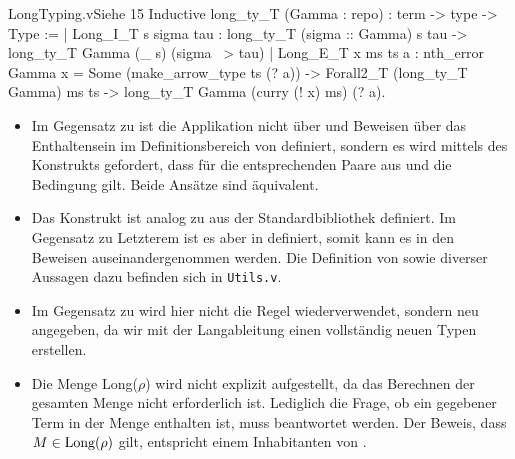 \begin{code}[long_ty_T]{LongTyping.v}{Siehe }{15}
Inductive long_ty_T (Gamma : repo) : term -> type -> Type :=
  | Long_I_T s sigma tau : long_ty_T (sigma :: Gamma) s tau ->
      long_ty_T Gamma (\_ s) (sigma ~> tau)
  | Long_E_T x ms ts a : 
      nth_error Gamma x = Some (make_arrow_type ts (? a)) ->
         Forall2_T (long_ty_T Gamma) ms ts -> 
           long_ty_T Gamma (curry (! x) ms) (? a).    
\end{code}
\begin{remark}
    \begin{itemize}
       \item Im Gegensatz zu  ist die Applikation nicht über  und Beweisen über das Enthaltensein im Definitionsbereich von  definiert, sondern es wird mittels des Konstrukts  gefordert, dass für die entsprechenden Paare aus  und  die Bedingung  gilt. Beide Ansätze sind äquivalent.
       \item Das Konstrukt  ist analog zu  aus der Standardbibliothek definiert. Im Gegensatz zu Letzterem ist es aber in \Type{} definiert, somit kann es in den Beweisen auseinandergenommen werden. Die Definition von  sowie diverser Aussagen dazu befinden sich in \texttt{Utils.v}.
       \item Im Gegensatz zu  wird hier nicht die Regel  wiederverwendet, sondern neu angegeben, da wir mit der Langableitung einen vollständig neuen Typen erstellen.
       \item Die Menge Long($\rho$) wird nicht explizit aufgestellt, da das Berechnen der gesamten Menge nicht erforderlich ist. Lediglich die Frage, ob ein gegebener Term in der Menge enthalten ist, muss beantwortet werden. Der Beweis, dass $M \in \text{Long}(\rho)$ gilt, entspricht einem Inhabitanten von .
    \end{itemize}
\end{remark}

